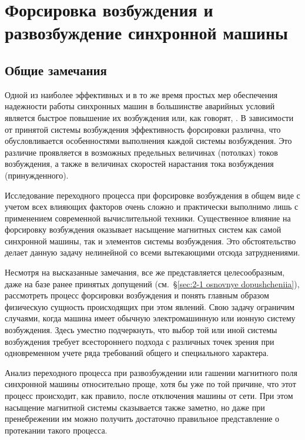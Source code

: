 \chapter{Форсировка возбуждения и развозбуждение синхронной машины}
\label{chap:8}

\section{Общие замечания}
\label{sec:8-1}

Одной из наиболее эффективных и в то же время простых мер обеспечения надежности работы синхронных машин в большинстве аварийных условий является быстрое повышение их возбуждения или, как говорят, . В зависимости от принятой системы возбуждения эффективность форсировки различна, что обусловливается особенностями выполнения каждой системы возбуждения. Это различие проявляется в возможных предельных величинах (потолках) токов возбуждения, а также в величинах скоростей нарастания тока возбуждения (принужденного).

Исследование переходного процесса при форсировке возбуждения в общем виде с учетом всех влияющих факторов очень сложно и практически выполнимо лишь с применением современной вычислительной техники. Существенное влияние на форсировку возбуждения оказывает насыщение магнитных систем как самой синхронной машины, так и элементов системы возбуждения. Это обстоятельство делает данную задачу нелинейной со всеми вытекающими отсюда затруднениями.

Несмотря на высказанные замечания, все же представляется целесообразным, даже на базе ранее принятых допущений (см.~§\ref{sec:2-1 osnovnye dopushcheniia}), рассмотреть процесс форсировки возбуждения и понять главным образом физическую сущность происходящих при этом явлений. Свою задачу ограничим случаями, когда машина имеет обычную электромашинную или ионную систему возбуждения. Здесь уместно подчеркнуть, что выбор той или иной системы возбуждения требует всестороннего подхода с различных точек зрения при одновременном учете ряда требований общего и специального характера.

Анализ переходного процесса при развозбуждении или гашении магнитного поля синхронной машины относительно проще, хотя бы уже по той причине, что этот процесс происходит, как правило, после отключения машины от сети. При этом насыщение магнитной системы сказывается также заметно, но даже при пренебрежении им можно получить достаточно правильное представление о протекании такого процесса.

